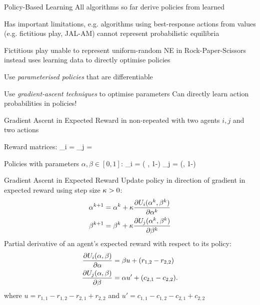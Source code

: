 \begin{frame}{Policy-Based Learning}
    All algorithms so far derive policies from learned 
    \blist
        \item Has important limitations, e.g. algorithms using best-response actions from values (e.g. fictitious play, JAL-AM) cannot represent probabilistic equilibria
        \item Fictitious play unable to represent uniform-random NE in Rock-Paper-Scissors
    \elist
    \pause
     instead uses learning data to directly optimise policies
    \blist
        \item Use {\it parameterised policies} that are differentiable
        \item Use {\it gradient-ascent techniques} to optimise parameters
        \listtab Can directly learn action probabilities in policies!
    \elist
\end{frame}

\begin{frame}{Gradient Ascent in Expected Reward}
     in non-repeated \nfgs with two agents $i,j$ and two actions

    Reward matrices:
    \bmath
	\Rew_i =  \hspace{2em}
	\Rew_j = 
    \emath

    \vspace{7pt}

    Policies with parameters $\alpha,\beta \in [0,1]$:
    \bmath
	\pol_i = ( \alpha , 1-\alpha ) \hspace{2em} \pol_j = (\beta , 1-\beta)
    \emath
\end{frame}

\begin{frame}[t]{Gradient Ascent in Expected Reward}
    Update policy in direction of gradient in expected reward using step size $\kappa > 0$:
    \begin{align*}
    	\alpha^{k+1} & = \alpha^k + \kappa \frac{\partial U_i(\alpha^k,\beta^k)}{\partial \alpha^k} \\
    	\beta^{k+1} & = \beta^k + \kappa \frac{\partial U_j(\alpha^k,\beta^k)}{\partial \beta^k}
    \end{align*}
    Partial derivative of an agent's expected reward with respect to its policy:
    \begin{align*}
    	\frac{\partial U_i(\alpha,\beta)}{\partial \alpha} & = \beta u + (r_{1,2} - r_{2,2}) \\
    	\frac{\partial U_j(\alpha,\beta)}{\partial \beta} & = \alpha u' + (c_{2,1} - c_{2,2}).
    \end{align*}
    where $u = r_{1,1} - r_{1,2} - r_{2,1} + r_{2,2}$ and $u' = c_{1,1} - c_{1,2} - c_{2,1} + c_{2,2}$
\end{frame}

